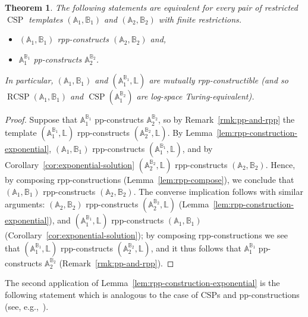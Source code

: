 \documentclass{article}
\newtheorem{theorem}{Theorem}
\theoremstyle{definition}
\theoremstyle{remark}
\DeclareMathOperator{\CSP}{CSP}
\DeclareMathOperator{\RCSP}{RCSP}
\newcommand{\bA}{{\mathbb A}}
\newcommand{\bB}{{\mathbb B}}
\newcommand{\bL}{{\mathbb L}}
\begin{document}
\begin{theorem}\label{thm:rpp-pp-constructions-finite-restriction}
    The following statements are equivalent for every pair of restricted
    $\CSP$ templates $(\bA_1,\bB_1)$ and $(\bA_2,\bB_2)$ with finite restrictions.
    \begin{itemize}
        \item  $(\bA_1,\bB_1)$ rpp-constructs $(\bA_2,\bB_2)$ and, 
        \item $\bA_1^{\bB_1}$ pp-constructs $\bA_2^{\bB_2}$.
    \end{itemize}
    In particular, $(\bA_1,\bB_1)$ and $(\bA_1^{\bB_1},\bL)$ are mutually rpp-constructible
    (and so $\RCSP(\bA_1,\bB_1)$ and $\CSP(\bA_1^{\bB_2})$ are log-space Turing-equivalent).
\end{theorem}
\begin{proof}
    Suppose that $\bA_1^{\bB_1}$ pp-constructs $\bA_2^{\bB_2}$, so by Remark~\ref{rmk:pp-and-rpp}
    the template $(\bA_1^{\bB_1},\bL)$ rpp-constructs $(\bA_2^{\bB_2},\bL)$. By
    Lemma~\ref{lem:rpp-construction-exponential}, $(\bA_1,\bB_1)$ rpp-constructs $(\bA_1^{\bB_1},\bL)$,
    and by Corollary~\ref{cor:exponential-solution} $(\bA_2^{\bB_2},\bL)$ rpp-constructs $(\bA_2,\bB_2)$.
    Hence, by composing rpp-constructions (Lemma~\ref{lem:rpp-compose}), we conclude that
    $(\bA_1,\bB_1)$ rpp-constructs $(\bA_2,\bB_2)$. The converse implication follows with similar arguments:
    $(\bA_2,\bB_2)$ rpp-constructs $(\bA_2^{\bB_2},\bL)$ (Lemma~\ref{lem:rpp-construction-exponential}), 
    and $(\bA_1^{\bB_1},\bL)$ rpp-constructs $(\bA_1,\bB_1)$ (Corollary~\ref{cor:exponential-solution});
    by composing rpp-constructions we see that $(\bA_1^{\bB_1},\bL)$ rpp-constructs $(\bA_2^{\bB_2},\bL)$,
    and it thus follows that $\bA_1^{\bB_1}$ pp-constructs $\bA_2^{\bB_2}$ (Remark~\ref{rmk:pp-and-rpp}).
\end{proof}

The second application of Lemma~\ref{lem:rpp-construction-exponential} is the following
statement which is analogous to the case of CSPs and pp-constructions (see, e.g.,~\cite[Theorem 3.2.2]{Book}).
\end{document}
